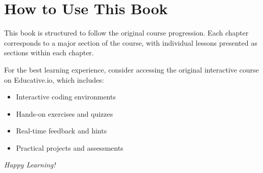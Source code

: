\documentclass[../Main.tex]{subfiles}
\begin{document}
\section*{How to Use This Book}
This book is structured to follow the original course progression. Each chapter corresponds to a major section of the course, with individual lessons presented as sections within each chapter.

For the best learning experience, consider accessing the original interactive course on Educative.io, which includes:
\begin{itemize}
    \item Interactive coding environments
    \item Hands-on exercises and quizzes
    \item Real-time feedback and hints
    \item Practical projects and assessments
\end{itemize}

\vspace{2cm}
\textit{Happy Learning!}
\end{document}
